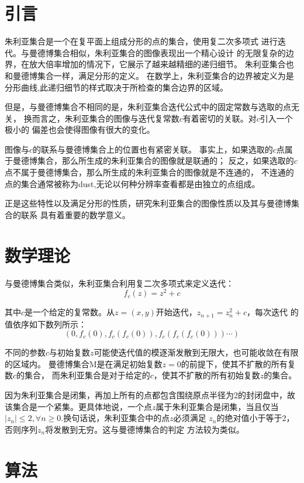 \section{引言}
朱利亚集合\cite{enwiki:1068868935}是一个在复平面上组成分形的点的集合，使用复二次多项式
进行迭代。与曼德博集合\cite{enwiki:1094796296}相似，朱利亚集合的图像表现出一个精心设计
的无限复杂的边界，在放大倍率增加的情况下，它展示了越来越精细的递归细节。
朱利亚集合也和曼德博集合一样，满足分形的定义。
在数学上，朱利亚集合的边界被定义为是分形曲线,此递归细节的样式取决于所检查的集合边界的区域。
\par 
但是，与曼德博集合不相同的是，朱利亚集合迭代公式中的固定常数与选取的点无关，
换而言之，朱利亚集合的图像与迭代复常数$c$有着密切的关联。对$c$引入一个极小的
偏差也会使得图像有很大的变化。
\par 
图像与$c$的联系与曼德博集合上的位置也有紧密关联\cite{s1992fractal}。
事实上，如果选取的$c$点属于曼德博集合，那么所生成的朱利亚集合的图像就是联通的；
反之，如果选取的$c$点不属于曼德博集合，那么所生成的朱利亚集合的图像就是不连通的，
不连通的点的集合通常被称为dust,无论以何种分辨率查看都是由独立的点组成。
\par
正是这些特性以及满足分形的性质，研究朱利亚集合的图像性质以及其与曼德博集合的联系
具有着重要的数学意义。

\section{数学理论}
与曼德博集合类似，朱利亚集合利用复二次多项式来定义迭代\cite{complexanalysis}：
$$f_c(z)=z^2+c$$
\par 
其中$c$是一个给定的复常数。从$z=(x,y)$开始迭代，$z_{n+1}=z^2_n+c$，每次迭代
的值依序如下数列所示：
$$(0,f_c(0),f_c(f_c(0)),f_c(f_c(f_c(0)))\cdots)$$
\par 
不同的参数$c$与初始复数$z$可能使迭代值的模逐渐发散到无限大，也可能收敛在有限的区域内。
曼德博集合$\mathrm{M}$是在满足初始复数$z=0$的前提下，使其不扩散的所有复数$c$的集合，
而朱利亚集合是对于给定的$c$，使其不扩散的所有初始复数$z$的集合。
\par 
因为朱利亚集合是闭集，再加上所有的点都包含围绕原点半径为2的封闭盘中，故
该集合是一个紧集。更具体地说，一个点$z$属于朱利亚集合是闭集，当且仅当
$|z_n|\leq 2,\forall n\geq 0$.换句话说，朱利亚集合中的点$z$必须满足
$z_n$的绝对值小于等于2，否则序列$z_n$将发散到无穷。这与曼德博集合的判定
方法较为类似。


\section{算法}
